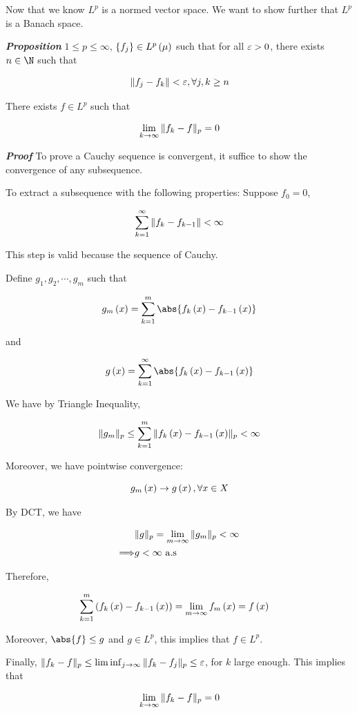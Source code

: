 \documentclass[
]{article}
\begin{document}
Now that we know \(L^p\) is a normed vector space. We want to show
further that \(L^p\) is a Banach space.

\emph{\textbf{Proposition}} \(1\le p\le \infty\),
\(\left\{f_j\right\}\in L^p\left(\mu\right)\) such that for all \(\varepsilon>0\), there exists
\(n\in \N\) such that

\[\|{f_j-f_k}\|<\varepsilon,\forall j,k\ge n\]

There exists \(f\in L^p\) such that

\[\lim_{k\to\infty}\|{f_k-f}\|_p = 0\]

\emph{\textbf{Proof}} To prove a Cauchy sequence is convergent, it
suffice to show the convergence of any subsequence.

To extract a subsequence with the following properties: Suppose
\(f_0 = 0\),

\[\sum_{{k} = 1}^{\infty} \|{f_k-f_{k-1}}\|<\infty\]

This step is valid because the sequence of Cauchy.

Define \(g_1,g_2,\cdots,g_m\) such that

\[g_m\pr{x} = \sum_{k = 1}^m\abs{f_k\pr{x}-f_{k-1}\pr{x}}\]

and

\[g\pr{x} = \sinf \abs{f_k\pr{x}-f_{k-1}\pr{x}}\]

We have by Triangle Inequality,

\[\|{g_m}\|_p\le \sum_{k = 1}^m\|{f_k\left(x\right)-f_{k-1}\left(x\right)}\|_p<\infty\]

Moreover, we have pointwise convergence:

\[g_m\left(x\right)\to g\left(x\right),\forall x\in X\]

By DCT, we have

\[\begin{aligned}
&\|{g}\|_p = \lim_{m\to\infty}\|{g_m}\|_p<\infty\\
\Longrightarrow & g<\infty \text{ a.s}
\end{aligned}\]

Therefore,

\[\begin{aligned}
\sum_{k  =1}^m\left(f_k\left(x\right)-f_{k-1}\left(x\right)\right) & = \lim_{m\to\infty}f_m\left(x\right) = f\left(x\right)
\end{aligned}\]

Moreover, \(\abs{f}\le g\) and \(g\in L^p\), this implies that
\(f\in L^p\).

Finally,
\(\|{f_k-f}\|_p\le \liminf_{j\to\infty}\|{f_k-f_j}\|_p\le \varepsilon\), for
\(k\) large enough. This implies that

\[\lim_{k\to\infty}\|{f_k-f}\|_p=0\]
\end{document}

